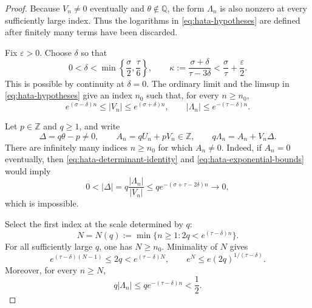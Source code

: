 \documentclass[11pt,reqno,letterpaper]{amsart}
\numberwithin{equation}{section}
\theoremstyle{definition}
\theoremstyle{remark}
\begin{document}
\begin{proof}
Because \(V_n\ne0\) eventually and \(\theta\notin\mathbb Q\), the form
\(\Lambda_n\) is also nonzero at every sufficiently large index.  Thus
the logarithms in \eqref{eq:hata-hypotheses} are defined after finitely
many terms have been discarded.

Fix \(\varepsilon>0\).  Choose \(\delta\) so that
\begin{equation}\label{eq:hata-delta-choice}
 0<\delta<\min\left\{\frac\sigma2,\frac\tau6\right\},
 \qquad
 \kappa:=\frac{\sigma+\delta}{\tau-3\delta}
 <\frac\sigma\tau+\frac\varepsilon2.
\end{equation}
This is possible by continuity at \(\delta=0\).  The ordinary limit and
the limsup in \eqref{eq:hata-hypotheses} give an index \(n_0\) such that,
for every \(n\geq n_0\),
\begin{equation}\label{eq:hata-exponential-bounds}
 e^{(\sigma-\delta)n}\leq|V_n|
 \leq e^{(\sigma+\delta)n},
 \qquad
 |\Lambda_n|\leq e^{-(\tau-\delta)n}.
\end{equation}

Let \(p\in\mathbb Z\) and \(q\geq1\), and write
\begin{equation}\label{eq:hata-determinant-identity}
 \Delta=q\theta-p\ne0,
 \qquad A_n=qU_n+pV_n\in\mathbb Z,
 \qquad q\Lambda_n=A_n+V_n\Delta.
\end{equation}
There are infinitely many indices \(n\geq n_0\) for which \(A_n\ne0\).
Indeed, if \(A_n=0\) eventually, then \eqref{eq:hata-determinant-identity}
and \eqref{eq:hata-exponential-bounds} would imply
\[
 0<|\Delta|=q\frac{|\Lambda_n|}{|V_n|}
 \leq q e^{-(\sigma+\tau-2\delta)n}\longrightarrow0,
\]
which is impossible.

Select the first index at the scale determined by \(q\):
\begin{equation}\label{eq:hata-first-index}
 N=N(q):=\min\{n\geq1:2q<e^{(\tau-\delta)n}\}.
\end{equation}
For all sufficiently large \(q\), one has \(N\geq n_0\).  Minimality
of \(N\) gives
\begin{equation}\label{eq:hata-first-index-size}
 e^{(\tau-\delta)(N-1)}\leq2q<e^{(\tau-\delta)N},
 \qquad
 e^N\leq e(2q)^{1/(\tau-\delta)}.
\end{equation}
Moreover, for every \(n\geq N\),
\begin{equation}\label{eq:hata-small-form-at-scale}
 q|\Lambda_n|\leq q e^{-(\tau-\delta)n}<\frac12.
\end{equation}


\end{proof}
\end{document}
